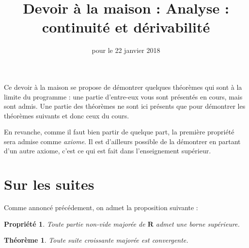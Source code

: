 \documentclass[12pt,a4paper,french]{article}
\title{Devoir à la maison \no{3} : Analyse : continuité et dérivabilité}
\author{\bsc{Ts 3}}
\date{pour le 22 janvier 2018}
\makeatletter
\renewcommand{\maketitle}%
{\framebox{%
    \begin{minipage}{1.0\linewidth}%
      \begin{center}%
        \Large \@title ~-- \@author \\%
        \@date%
      \end{center}%
    \end{minipage}}%
  \normalsize%
}
\newcommand{\R}{\mathbf{R}}
\theoremstyle{break}
\newtheorem{propriete}{Propriété}
\newtheorem{theoreme}{Théorème}
\theoremstyle{plain}
\theoremstyle{nonumberplain}
\theoremstyle{nonumberbreak}
\makeatother
\begin{document}
\maketitle

\bigskip

Ce devoir à la maison se propose de démontrer quelques théorèmes qui
sont à la limite du programme : une partie d'entre-eux vous sont
présentés en cours, mais sont admis. Une partie des théorèmes ne sont
ici présents que pour démontrer les théorèmes suivants et donc ceux du
cours.

En revanche, comme il faut bien partir de quelque part, la première
propriété sera admise comme \emph{axiome}. Il est d'ailleurs possible de
la démontrer en partant d'un autre axiome, c'est ce qui est fait dans
l'enseignement supérieur.

\section{Sur les suites}

Comme annoncé précédement, on admet la proposition suivante :

\begin{propriete}
  Toute partie non-vide majorée de $\R$ admet une borne supérieure.
\end{propriete}

\begin{theoreme}
  Toute suite croissante majorée est convergente.
\end{theoreme}
\end{document}
